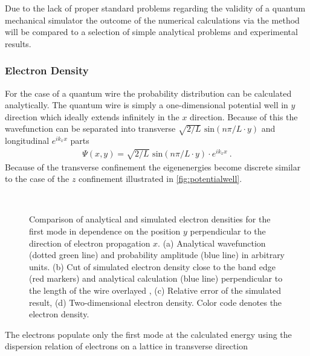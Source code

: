 Due to the lack of proper standard problems regarding the validity of a quantum mechanical simulator the outcome of the numerical calculations via the \gfnc{} method will be compared to a selection of simple analytical problems and experimental results.\par
\subsubsection{Electron Density}
For the case of a quantum wire the probability distribution can be calculated analytically. The quantum wire is simply a one-dimensional potential well in $y$ direction which ideally extends infinitely in the $x$ direction.
Because of this the wavefunction can be separated into transverse $\sqrt{2/L}\text{ sin}(n\pi/L \cdot y)$ and longitudinal $e^{ik_xx}$ parts
\begin{align}
\Psi(x,y) = \sqrt{2/L}\text{ sin}(n\pi/L \cdot y) \cdot e^{ik_xx}\ .
\end{align}
Because of the transverse confinement the eigenenergies become discrete similar to the case of the $z$ confinement illustrated in \cref{fig:potentialwell}.
\begin{figure}[h!]
  \begin{center}
 \qquad
    \\
    \qquad
    \caption{Comparison of analytical and simulated electron densities for the first mode in dependence on the position $y$ perpendicular to the direction of electron propagation $x$. (a) Analytical wavefunction (dotted green line) and probability amplitude (blue line) in arbitrary units. (b) Cut of simulated electron density close to the band edge (red markers) and analytical calculation (blue line) perpendicular to the length of the wire overlayed , (c) Relative error of the simulated result, (d) Two-dimensional electron density. Color code denotes the electron density. }\label{fig:mode1}
  \end{center}
\end{figure}
The electrons populate only the first mode at the calculated energy using the dispersion relation of electrons on a lattice in transverse direction
